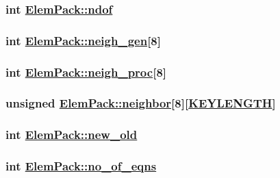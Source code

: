 \hypertarget{structElemPack_o6}{
\subsubsection[ndof]{\setlength{\rightskip}{0pt plus 5cm}int \hyperlink{structElemPack_o6}{Elem\-Pack::ndof}}}
\label{structElemPack_o6}


\hypertarget{structElemPack_o5}{
\subsubsection[neigh\_\-gen]{\setlength{\rightskip}{0pt plus 5cm}int \hyperlink{structElemPack_o5}{Elem\-Pack::neigh\_\-gen}\mbox{[}8\mbox{]}}}
\label{structElemPack_o5}


\hypertarget{structElemPack_o3}{
\subsubsection[neigh\_\-proc]{\setlength{\rightskip}{0pt plus 5cm}int \hyperlink{structElemPack_o3}{Elem\-Pack::neigh\_\-proc}\mbox{[}8\mbox{]}}}
\label{structElemPack_o3}


\hypertarget{structElemPack_o22}{
\subsubsection[neighbor]{\setlength{\rightskip}{0pt plus 5cm}unsigned \hyperlink{structElemPack_o22}{Elem\-Pack::neighbor}\mbox{[}8\mbox{]}\mbox{[}\hyperlink{constant_8h_a10}{KEYLENGTH}\mbox{]}}}
\label{structElemPack_o22}


\hypertarget{structElemPack_o11}{
\subsubsection[new\_\-old]{\setlength{\rightskip}{0pt plus 5cm}int \hyperlink{structElemPack_o11}{Elem\-Pack::new\_\-old}}}
\label{structElemPack_o11}


\hypertarget{structElemPack_o7}{
\subsubsection[no\_\-of\_\-eqns]{\setlength{\rightskip}{0pt plus 5cm}int \hyperlink{structElemPack_o7}{Elem\-Pack::no\_\-of\_\-eqns}}}
\label{structElemPack_o7}


